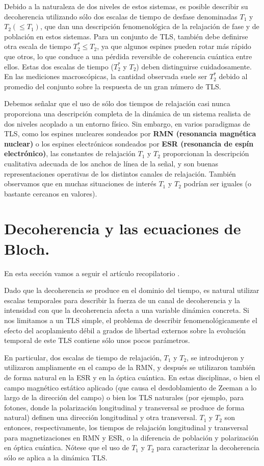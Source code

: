     Debido a la naturaleza de dos niveles de estos sistemas, es posible describir su decoherencia utilizando sólo dos escalas de tiempo de desfase denominadas $T_1$ y $T_2(\leq T_1)$, que dan una descripción fenomenológica de la  relajación de fase y de población en estos sistemas. Para un conjunto de TLS, también debe definirse otra escala de tiempo $T^*_2 \leq T_2$, ya que algunos espines pueden rotar más rápido que otros, lo que conduce a una pérdida reversible de coherencia cuántica entre ellos. Estas dos escalas de tiempo ($T^*_2$ y $T_2$) deben distinguirse cuidadosamente. En las mediciones macroscópicas, la cantidad observada suele ser $T^*_2$ debido al promedio del conjunto sobre la respuesta de un gran número de TLS. 
    
    Debemos señalar que el uso de sólo dos tiempos de relajación casi nunca proporciona una descripción completa de la dinámica de un sistema realista de dos niveles acoplado a un entorno físico. Sin embargo, en varios paradigmas de TLS, como los espines nucleares sondeados por \textbf{RMN (resonancia magnética nuclear)} o los espines electrónicos sondeados por \textbf{ESR (resonancia de espín electrónico)}, las constantes de relajación $T_1$ y $T_2$ proporcionan la descripción cualitativa adecuada de los anchos de línea de la señal, y son buenas representaciones operativas de los distintos canales de relajación. También observamos que en muchas situaciones de interés $T_1$ y $T_2$ podrían ser iguales (o bastante cercanos en valores).

\section{Decoherencia y las ecuaciones de Bloch.}

    En esta sección vamos a seguir el artículo recopilatorio \cite{bib_Decoherence_and_dephasing}.
    
    Dado que la decoherencia se produce en el dominio del tiempo, es natural utilizar escalas temporales para describir la fuerza de un canal de decoherencia y la intensidad con que la decoherencia afecta a una variable dinámica concreta. Si nos limitamos a un TLS simple, el problema de describir fenomenológicamente el efecto del acoplamiento débil a grados de libertad externos sobre la evolución temporal de este TLS contiene sólo unos pocos parámetros. 
    
    En particular, dos escalas de tiempo de relajación, $T_1$ y $T_2$, se introdujeron y utilizaron ampliamente en el campo de la RMN, y después se utilizaron también de forma natural en la ESR y en la óptica cuántica. En estas disciplinas, o bien el campo magnético estático aplicado (que causa el desdoblamiento de Zeeman a lo largo de la dirección del campo) o bien los TLS naturales (por ejemplo, para fotones, donde la polarización longitudinal y transversal se produce de forma natural) definen una dirección longitudinal y otra transversal. $T_1$ y $T_2$ son entonces, respectivamente, los tiempos de relajación longitudinal y transversal para magnetizaciones en RMN y ESR, o la diferencia de población y polarización en óptica cuántica. Nótese que el uso de $T_1$ y $T_2$ para caracterizar la decoherencia sólo se aplica a la dinámica TLS.
    
